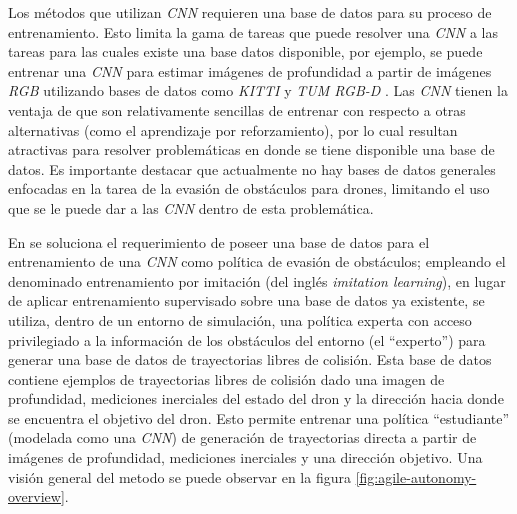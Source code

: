     \par Los métodos que utilizan \textit{CNN} requieren una base de datos para su proceso de entrenamiento. Esto limita la gama de tareas que puede resolver una \textit{CNN} a las tareas para las cuales existe una base datos disponible, por ejemplo, se puede entrenar una \textit{CNN} para estimar imágenes de profundidad a partir de imágenes \textit{RGB} utilizando bases de datos como \textit{KITTI} \cite{Geiger2013} y \textit{TUM RGB-D} \cite{Sturm2012}. Las \textit{CNN} tienen la ventaja de que son relativamente sencillas de entrenar con respecto a otras alternativas (como el aprendizaje por reforzamiento), por lo cual resultan atractivas para resolver problemáticas en donde se tiene disponible una base de datos. Es importante destacar que actualmente no hay bases de datos generales enfocadas en la tarea de la evasión de obstáculos para drones, limitando el uso que se le puede dar a las \textit{CNN} dentro de esta problemática. 
    
    \par En \cite{Loquercio2021} se soluciona el requerimiento de poseer una base de datos para el entrenamiento de una \textit{CNN} como política de evasión de obstáculos; empleando el denominado entrenamiento por imitación (del inglés \textit{imitation learning}), en lugar de aplicar entrenamiento supervisado sobre una base de datos ya existente, se utiliza, dentro de un entorno de simulación, una política experta con acceso privilegiado a la información de los obstáculos del entorno (el ``experto'') para generar una base de datos de trayectorias libres de colisión. Esta base de datos contiene ejemplos de trayectorias libres de colisión dado una imagen de profundidad, mediciones inerciales del estado del dron y la dirección hacia donde se encuentra el objetivo del dron. Esto permite entrenar una política ``estudiante'' (modelada como una \textit{CNN}) de generación de trayectorias directa a partir de imágenes de profundidad, mediciones inerciales y una dirección objetivo. Una visión general del metodo se puede observar en la figura \ref{fig:agile-autonomy-overview}.

